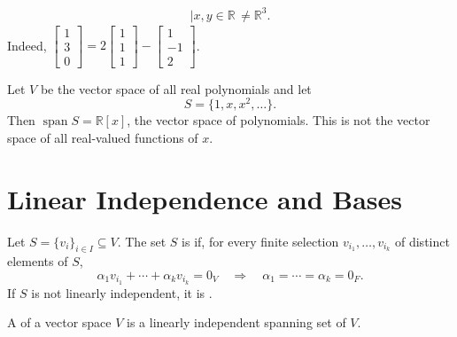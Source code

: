 \begin{Example}
\begin{align*}
{      \mid x,y\in\mathbb R\,}\ne\mathbb R^3.
\end{align*}
Indeed, $\begin{bmatrix}1\\3\\0\end{bmatrix}= 2\begin{bmatrix}1\\1\\1\end{bmatrix}-\begin{bmatrix}1\\-1\\2\end{bmatrix}$.
\end{Example}

\begin{Example}
Let $V$ be the vector space of all real polynomials and let
\begin{equation*}
S=\{1,x,x^2,\ldots\}.
\end{equation*}
Then $\operatorname{span}S=\mathbb R[x]$, the vector space of polynomials. This is not the vector space of all real-valued functions of $x$.
\end{Example}

\section{Linear Independence and Bases}\label{sec:Bases}

\begin{Definition}
Let $S=\{v_i\}_{i\in I}\subseteq V$. The set $S$ is  if, for every finite selection $v_{i_1},\ldots,v_{i_k}$ of distinct elements of $S$,
\begin{equation*}
\alpha_1v_{i_1}+\cdots+\alpha_kv_{i_k}=0_V
\quad\Longrightarrow\quad
\alpha_1=\cdots=\alpha_k=0_F.
\end{equation*}
If $S$ is not linearly independent, it is .
\end{Definition}

\begin{Definition}
A  of a vector space $V$ is a linearly independent spanning set of $V$.
\end{Definition}

